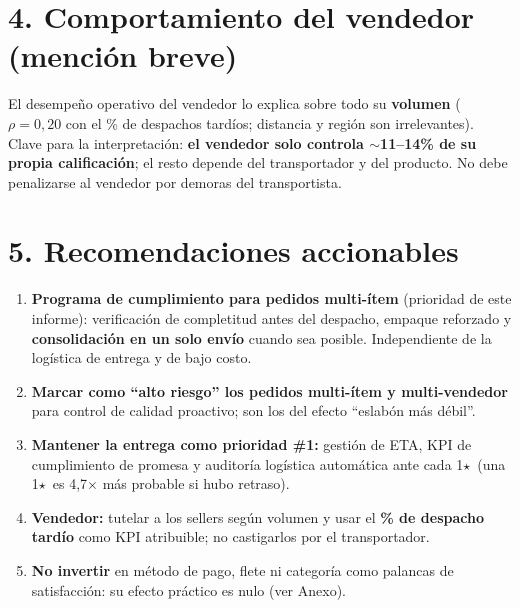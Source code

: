 \documentclass[10pt]{article}
\newcommand{\stars}{$\star$}
\newcommand{\kpi}[1]{\textbf{\textcolor{azlt}{#1}}}            %
\newcommand{\lead}[1]{\textcolor{az}{\sffamily\bfseries #1}}   %
\begin{document}
\section{4. Comportamiento del vendedor (mención breve)}
El desempeño operativo del vendedor lo explica sobre todo su \textbf{volumen} ($\rho=0{,}20$ con el \% de despachos tardíos; distancia y región son irrelevantes). Clave para la interpretación: \kpi{el vendedor solo controla $\sim$11--14\% de su propia calificación}; el resto depende del transportador y del producto. No debe penalizarse al vendedor por demoras del transportista.

\section{5. Recomendaciones accionables}
\begin{enumerate}
\item \lead{Programa de cumplimiento para pedidos multi-ítem} (prioridad de este informe): verificación de completitud antes del despacho, empaque reforzado y \textbf{consolidación en un solo envío} cuando sea posible. Independiente de la logística de entrega y de bajo costo.
\item \lead{Marcar como ``alto riesgo'' los pedidos multi-ítem y multi-vendedor} para control de calidad proactivo; son los del efecto ``eslabón más débil''.
\item \lead{Mantener la entrega como prioridad \#1:} gestión de ETA, KPI de cumplimiento de promesa y auditoría logística automática ante cada 1\stars\ (una 1\stars\ es 4,7$\times$ más probable si hubo retraso).
\item \lead{Vendedor:} tutelar a los sellers según volumen y usar el \textbf{\% de despacho tardío} como KPI atribuible; no castigarlos por el transportador.
\item \lead{No invertir} en método de pago, flete ni categoría como palancas de satisfacción: su efecto práctico es nulo (ver Anexo).
\end{enumerate}
\end{document}
